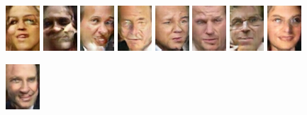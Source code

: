 \begin{figure}[!h]
    \centerline{
        \includegraphics[scale=1]{figures/lfw/appendix3/lfw64x48color_image0024.png}
        \includegraphics[scale=1]{figures/lfw/appendix3/lfw64x48color_image0025.png}
        \includegraphics[scale=1]{figures/lfw/appendix3/lfw64x48color_image0026.png}
        \includegraphics[scale=1]{figures/lfw/appendix3/lfw64x48color_image0027.png}
        \includegraphics[scale=1]{figures/lfw/appendix3/lfw64x48color_image0028.png}
        \includegraphics[scale=1]{figures/lfw/appendix3/lfw64x48color_image0029.png}
        \includegraphics[scale=1]{figures/lfw/appendix3/lfw64x48color_image0030.png}
        \includegraphics[scale=1]{figures/lfw/appendix3/lfw64x48color_image0031.png}
    }
    \vspace{0.1cm}
    \centerline{
        \includegraphics[scale=1]{figures/lfw/appendix3/lfw64x48color_image0032.png}
}
\end{figure}
